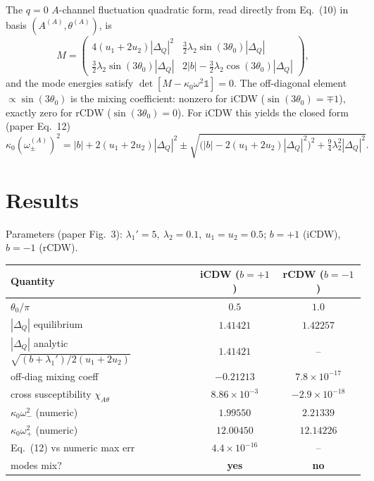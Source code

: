 \documentclass[11pt]{article}
\begin{document}
The $q=0$ $A$-channel fluctuation quadratic form, read directly from Eq.~(10) in
basis $(A^{(A)},\theta^{(A)})$, is
\begin{equation}
M=\begin{pmatrix}
4(u_1+2u_2)|\Delta_Q|^2 & \tfrac{3}{2}\lambda_2\sin(3\theta_0)|\Delta_Q|\\[2pt]
\tfrac{3}{2}\lambda_2\sin(3\theta_0)|\Delta_Q| & 2|b|-\tfrac{3}{2}\lambda_2\cos(3\theta_0)|\Delta_Q|
\end{pmatrix},
\end{equation}
and the mode energies satisfy $\det[M-\kappa_0\omega^2\mathbb{1}]=0$. The
off-diagonal element $\propto\sin(3\theta_0)$ is the mixing coefficient: nonzero
for iCDW ($\sin(3\theta_0)=\mp1$), exactly zero for rCDW ($\sin(3\theta_0)=0$).
For iCDW this yields the closed form (paper Eq.~12)
\begin{equation}
\kappa_0(\omega_\pm^{(A)})^2 = |b|+2(u_1+2u_2)|\Delta_Q|^2
   \pm\sqrt{\big(|b|-2(u_1+2u_2)|\Delta_Q|^2\big)^2+\tfrac{9}{4}\lambda_2^2|\Delta_Q|^2}.
\end{equation}

\section{Results}
Parameters (paper Fig.~3): $\lambda_1'=5,\ \lambda_2=0.1,\ u_1=u_2=0.5$;
$b=+1$ (iCDW), $b=-1$ (rCDW).

\begin{table}[h]\centering
\begin{tabular}{lcc}
\toprule
Quantity & iCDW ($b{=}+1$) & rCDW ($b{=}-1$)\\
\midrule
$\theta_0/\pi$ & $0.5$ & $1.0$\\
$|\Delta_Q|$ equilibrium & $1.41421$ & $1.42257$\\
$|\Delta_Q|$ analytic $\sqrt{(b+\lambda_1')/2(u_1{+}2u_2)}$ & $1.41421$ & --\\
off-diag mixing coeff & $-0.21213$ & $7.8\times10^{-17}$\\
cross susceptibility $\chi_{A\theta}$ & $8.86\times10^{-3}$ & $-2.9\times10^{-18}$\\
$\kappa_0\omega_-^2$ (numeric) & $1.99550$ & $2.21339$\\
$\kappa_0\omega_+^2$ (numeric) & $12.00450$ & $12.14226$\\
Eq.~(12) vs numeric max err & $4.4\times10^{-16}$ & --\\
modes mix? & \textbf{yes} & \textbf{no}\\
\bottomrule
\end{tabular}
\end{table}
\end{document}
